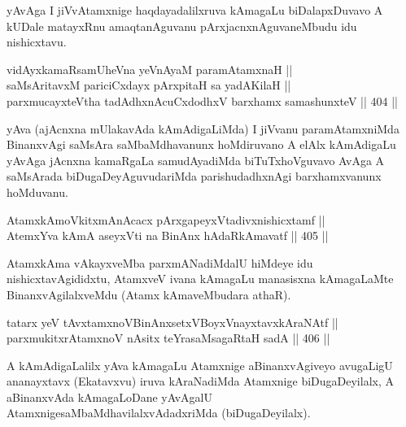\begin{artha}
yAvAga I jiVvAtamxnige haqdayadalilxruva kAmagaLu biDalapxDu\-vavo A
kUDale matayxRnu amaqtanAguvanu pArxjacnxnAguvaneMbudu idu nishicxtavu.
\end{artha}

\begin{shl}
vidAyxkamaRsamUheVna yeVnAyaM paramAtamxnaH || \\
saMsAritavxM pariciCxdayx pArxpitaH sa yadA\s KilaH || \\
parxmucayxteV\s tha tadAdhxnAcuCxdodhxV barxhamx samashunxteV \hfill || 404 ||  
\end{shl}

\begin{artha}
yAva (ajAcnxna mUlakavAda kAmAdigaLiMda) I jiVvanu paramAtamxniMda
BinanxvAgi saMsAra saMbaMdhavanunx hoMdiruvano A elAlx kAmAdigaLu yAvAga
jAcnxna kamaRgaLa samudAyadiMda biTuTxhoVguvavo AvAga A saMsArada
biDugaDeyAguvudariMda parishudadhxnAgi barxhamxvanunx hoMduvanu.
\end{artha}

\begin{shl}
AtamxkAmoVkitxmAnAcacx pArxgapeyxVtadivxnishicxtamf || \\
AtemxYva kAmA aseyxVti na BinAnx hAdaRkAmavatf \hfill || 405 ||  
\end{shl}

\begin{artha}
AtamxkAma vAkayxveMba parxmANadiMdalU hiMdeye idu nishicxtavAgididxtu,
AtamxveV ivana kAmagaLu manasisxna kAmagaLaMte BinanxvAgilalxveMdu
(Atamx kAmaveMbudara athaR).
\end{artha}


\begin{shl}
tatarx yeV tAvxtamxnoV\s BinAnxsetxVBoyxV\s nayxtavxkAraNAtf ||  \\
parxmukitxrAtamxnoV nAsitx teYrasaMsagaRtaH sadA \hfill || 406 ||  
\end{shl}

\begin{artha}
A kAmAdigaLalilx yAva kAmagaLu Atamxnige aBinanxvAgiveyo avugaLigU
ananayxtavx (Ekatavxvu) iruva kAraNadiMda Atamxnige biDugaDeyilalx, A
aBinanxvAda kAmagaLoDane yAvAgalU Atamxnige\break saMbaMdhavilalxvAdadxriMda
(biDugaDeyilalx).
\end{artha}


